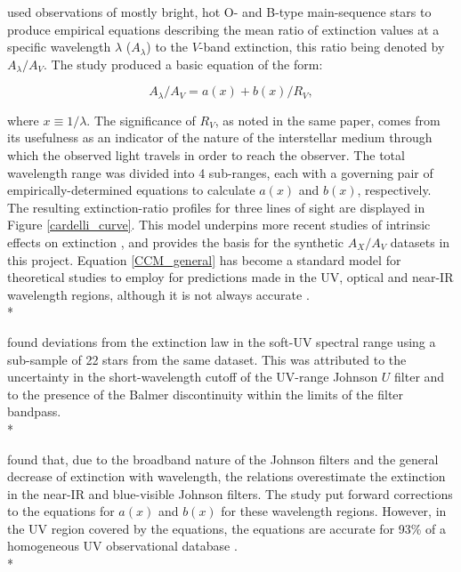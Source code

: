 \documentclass[12pt, a4paper]{report}
\begin{document}
\cite{1989ApJ...345..245C} used observations of mostly bright, hot O- and B-type main-sequence stars to produce empirical equations describing the mean ratio of extinction values at a specific wavelength $\lambda$ ($A_{\lambda}$) to the $V$-band extinction, this ratio being denoted by $A_{\lambda}/A_{V}$. The study produced a basic equation of the form:

\begin{equation}
A_{\lambda}/A_{V} = a(x) + b(x)/R_{V},
\label{CCM_general}
\end{equation}

where $x \equiv 1/\lambda$. The significance of $R_{V}$, as noted in the same paper, comes from its usefulness as an indicator of the nature of the interstellar medium through which the observed light travels in order to reach the observer. The total wavelength range was divided into 4 sub-ranges, each with a governing pair of empirically-determined equations to calculate $a(x)$ and $b(x)$, respectively. The resulting extinction-ratio profiles for three lines of sight are displayed in Figure \ref{cardelli_curve}. This model underpins more recent studies of intrinsic effects on extinction \citep{2008PASP..120..583G,2014MNRAS.444..392C,2018MNRAS.475.5023C,2018MNRAS.479L.102C}, and provides the basis for the synthetic $A_{X}/A_{V}$ datasets in this project. Equation \ref{CCM_general} has become a standard model for theoretical studies to employ for predictions made in the UV, optical and near-IR wavelength regions, although it is not always accurate \citep{1994ApJ...422..158O,1999PASP..111...63F}. \\*

\cite{1994ApJ...422..158O} found deviations from the \cite{1989ApJ...345..245C} extinction law in the soft-UV spectral range using a sub-sample of 22 stars from the same dataset. This was attributed to the uncertainty in the short-wavelength cutoff of the UV-range Johnson $U$ filter and to the presence of the Balmer discontinuity within the limits of the filter bandpass.\\*

\cite{1999PASP..111...63F} found that, due to the broadband nature of the Johnson filters and the general decrease of extinction with wavelength, the \cite{1989ApJ...345..245C} relations overestimate the extinction in the near-IR and blue-visible Johnson filters. The study put forward corrections to the equations for $a(x)$ and $b(x)$ for these wavelength regions. However, in the UV region covered by  the \cite{1989ApJ...345..245C} equations, the equations are accurate for 93\% of a homogeneous UV observational database \citep{2004ApJ...616..912V}.\\*
\end{document}
